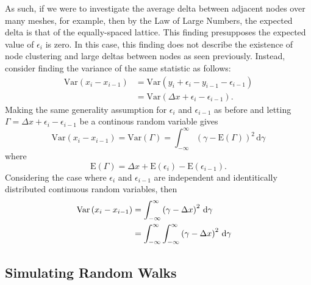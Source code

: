 \documentclass[11pt,a4paper]{article}
\begin{document}
		As such, if we were to investigate the average delta between adjacent nodes over many meshes, for example, then by the Law of Large Numbers, the expected delta is that of the equally-spaced lattice. This finding presupposes the expected value of $\epsilon_i$ is zero. In this case, this finding does not describe the existence of node clustering and large deltas between nodes as seen previously. Instead, consider finding the variance of the same statistic as follows:
		\begin{align*}
			\mathrm{Var} \left(x_i - x_{i-1} \right) &= \mathrm{Var} \left(y_i + \epsilon_i - y_{i-1} - \epsilon_{i-1} \right) \\
			&= \mathrm{Var} \left(\Delta x + \epsilon_i - \epsilon_{i-1} \right).
		\end{align*}
		Making the same generality assumption for $\epsilon_i$ and $\epsilon_{i-1}$ as before and letting $\Gamma = \Delta x + \epsilon_i - \epsilon_{i-1}$ be a continous random variable gives
		\begin{equation*}
			\mathrm{Var} \left(x_i - x_{i-1} \right) = \mathrm{Var} \left(\Gamma \right) = \int_{-\infty}^{\infty} \left(\gamma - \mathrm{E}(\Gamma) \right)^2 \,\mathrm{d}\gamma
		\end{equation*}
		where
		\begin{equation*}
			\mathrm{E} \left(\Gamma \right) = \Delta x + \mathrm{E} \left(\epsilon_{i} \right) - \mathrm{E} \left(\epsilon_{i-1} \right).
		\end{equation*}
		Considering the case where $\epsilon_i$ and $\epsilon_{i-1}$ are independent and identitically distributed continuous random variables, then
		\begin{align*}
			\phantom{\mathrm{Var} \left(x_i - x_{i-1} \right)}
			&\begin{aligned}
				\mathllap{\mathrm{Var} \left(x_i - x_{i-1} \right)} &= \int_{-\infty}^{\infty} \left(\gamma - \Delta x \right)^2 \,\mathrm{d}\gamma \\
			\end{aligned} \\
			&\begin{aligned}
				&= \int_{-\infty}^{\infty} \int_{-\infty}^{\infty} \left(\gamma - \Delta x \right)^2 \,\mathrm{d}\gamma
			\end{aligned}
		\end{align*}
	

	\subsection{Simulating Random Walks}
		\label{sub:simulatingrandomwalks}
		
\end{document}
